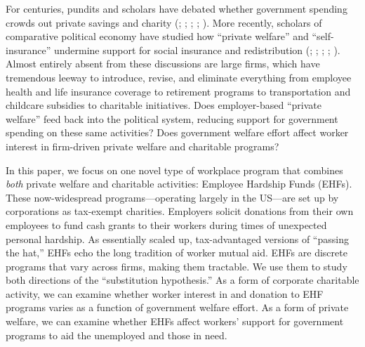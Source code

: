 \documentclass[
  11pt,
  oneside]{article}
\begin{document}
For centuries, pundits and scholars have debated whether government spending crowds out private savings and charity (; ; ; ; ). More recently, scholars of comparative political economy have studied how ``private welfare'' and ``self-insurance'' undermine support for social insurance and redistribution (; ; ; ; ). Almost entirely absent from these discussions are large firms, which have tremendous leeway to introduce, revise, and eliminate everything from employee health and life insurance coverage to retirement programs to transportation and childcare subsidies to charitable initiatives. Does employer-based ``private welfare'' feed back into the political system, reducing support for government spending on these same activities? Does government welfare effort affect worker interest in firm-driven private welfare and charitable programs?

In this paper, we focus on one novel type of workplace program that combines \emph{both} private welfare and charitable activities: Employee Hardship Funds (EHFs). These now-widespread programs---operating largely in the US---are set up by corporations as tax-exempt charities. Employers solicit donations from their own employees to fund cash grants to their workers during times of unexpected personal hardship. As essentially scaled up, tax-advantaged versions of ``passing the hat,'' EHFs echo the long tradition of worker mutual aid. EHFs are discrete programs that vary across firms, making them tractable. We use them to study both directions of the ``substitution hypothesis.'' As a form of corporate charitable activity, we can examine whether worker interest in and donation to EHF programs varies as a function of government welfare effort. As a form of private welfare, we can examine whether EHFs affect workers' support for government programs to aid the unemployed and those in need.
\end{document}

